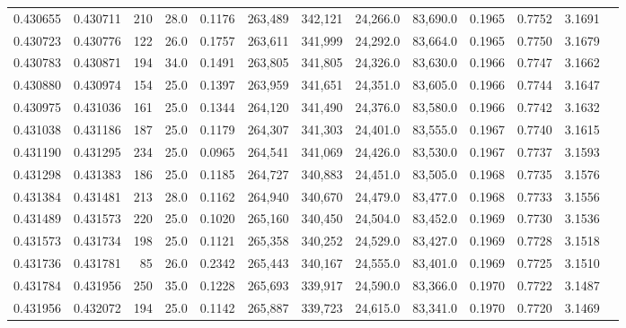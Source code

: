 \begin{tabular}{rrrrrrrrrrrrr}
0.430655 & 0.430711 &   210 & 28.0 &                                     0.1176 & 263,489 & 342,121 &  24,266.0 &  83,690.0 & 0.1965 & 0.7752 & 3.1691 \\
0.430723 & 0.430776 &   122 & 26.0 &                                     0.1757 & 263,611 & 341,999 &  24,292.0 &  83,664.0 & 0.1965 & 0.7750 & 3.1679 \\
0.430783 & 0.430871 &   194 & 34.0 &                                     0.1491 & 263,805 & 341,805 &  24,326.0 &  83,630.0 & 0.1966 & 0.7747 & 3.1662 \\
0.430880 & 0.430974 &   154 & 25.0 &                                     0.1397 & 263,959 & 341,651 &  24,351.0 &  83,605.0 & 0.1966 & 0.7744 & 3.1647 \\
0.430975 & 0.431036 &   161 & 25.0 &                                     0.1344 & 264,120 & 341,490 &  24,376.0 &  83,580.0 & 0.1966 & 0.7742 & 3.1632 \\
0.431038 & 0.431186 &   187 & 25.0 &                                     0.1179 & 264,307 & 341,303 &  24,401.0 &  83,555.0 & 0.1967 & 0.7740 & 3.1615 \\
0.431190 & 0.431295 &   234 & 25.0 &                                     0.0965 & 264,541 & 341,069 &  24,426.0 &  83,530.0 & 0.1967 & 0.7737 & 3.1593 \\
0.431298 & 0.431383 &   186 & 25.0 &                                     0.1185 & 264,727 & 340,883 &  24,451.0 &  83,505.0 & 0.1968 & 0.7735 & 3.1576 \\
0.431384 & 0.431481 &   213 & 28.0 &                                     0.1162 & 264,940 & 340,670 &  24,479.0 &  83,477.0 & 0.1968 & 0.7733 & 3.1556 \\
0.431489 & 0.431573 &   220 & 25.0 &                                     0.1020 & 265,160 & 340,450 &  24,504.0 &  83,452.0 & 0.1969 & 0.7730 & 3.1536 \\
0.431573 & 0.431734 &   198 & 25.0 &                                     0.1121 & 265,358 & 340,252 &  24,529.0 &  83,427.0 & 0.1969 & 0.7728 & 3.1518 \\
0.431736 & 0.431781 &    85 & 26.0 &                                     0.2342 & 265,443 & 340,167 &  24,555.0 &  83,401.0 & 0.1969 & 0.7725 & 3.1510 \\
0.431784 & 0.431956 &   250 & 35.0 &                                     0.1228 & 265,693 & 339,917 &  24,590.0 &  83,366.0 & 0.1970 & 0.7722 & 3.1487 \\
0.431956 & 0.432072 &   194 & 25.0 &                                     0.1142 & 265,887 & 339,723 &  24,615.0 &  83,341.0 & 0.1970 & 0.7720 & 3.1469 \\

\end{tabular}
